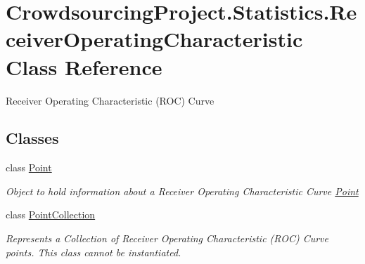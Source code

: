 \hypertarget{class_crowdsourcing_project_1_1_statistics_1_1_receiver_operating_characteristic}{}\section{Crowdsourcing\+Project.\+Statistics.\+Receiver\+Operating\+Characteristic Class Reference}
\label{class_crowdsourcing_project_1_1_statistics_1_1_receiver_operating_characteristic}


Receiver Operating Characteristic (R\+O\+C) Curve  


\subsection*{Classes}
\begin{DoxyCompactItemize}
\item 
class \hyperlink{class_crowdsourcing_project_1_1_statistics_1_1_receiver_operating_characteristic_1_1_point}{Point}
\begin{DoxyCompactList}\small\item\em Object to hold information about a Receiver Operating Characteristic Curve \hyperlink{class_crowdsourcing_project_1_1_statistics_1_1_receiver_operating_characteristic_1_1_point}{Point} \end{DoxyCompactList}\item 
class \hyperlink{class_crowdsourcing_project_1_1_statistics_1_1_receiver_operating_characteristic_1_1_point_collection}{Point\+Collection}
\begin{DoxyCompactList}\small\item\em Represents a Collection of Receiver Operating Characteristic (R\+O\+C) Curve points. This class cannot be instantiated. \end{DoxyCompactList}\end{DoxyCompactItemize}
